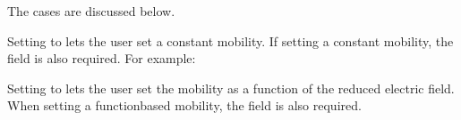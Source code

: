 \documentclass[letterpaper,10pt,english]{sphinxmanual}
\begin{document}
\sphinxAtStartPar
The cases are discussed below.

\sphinxAtStartPar
{}

\sphinxAtStartPar
Setting  to  lets the user set a constant mobility.
If setting a constant mobility, the field  is also required.
For example:

\begin{sphinxVerbatim}[commandchars=\\\{\},formatcom=\scriptsize]
  \PYG{p}{[}
            
      
         
        
  \PYG{p}{]}
\end{sphinxVerbatim}

\sphinxAtStartPar
{}

\sphinxAtStartPar
Setting  to   lets the user set the mobility as a function of the reduced electric field.
When setting a function\sphinxhyphen{}based mobility, the field  is also required.
\end{document}
